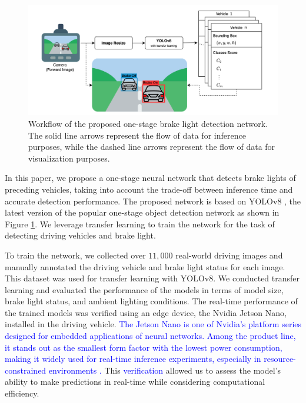 \begin{figure}[]
    \includegraphics[scale=0.5]{fig/workflow.png}
    \caption{Workflow of the proposed one-stage brake light detection network. The solid line arrows represent the flow of data for inference purposes, while the dashed line arrows represent the flow of data for visualization purposes.}
    \label{fig:workflow}
\end{figure}

In this paper, we propose a one-stage neural network that detects brake lights of preceding vehicles, taking into account the trade-off between inference time and accurate detection performance. 
The proposed network is based on YOLOv8 \cite{YOLOv8}, the latest version of the popular one-stage object detection network as shown in Figure \ref{fig:workflow}.
We leverage transfer learning to train the network for the task of detecting driving vehicles and brake light.

To train the network, we collected over $11,000$ real-world driving images and manually annotated the driving vehicle and brake light status for each image.
This dataset was used for transfer learning with YOLOv8. 
We conducted transfer learning and evaluated the performance of the models in terms of model size, brake light status, and ambient lighting conditions.
The real-time performance of the trained models was verified using an edge device, the Nvidia Jetson Nano, installed in the driving vehicle.
\textcolor{blue}{The Jetson Nano is one of Nvidia's platform series designed for embedded applications of neural networks.
Among the product line, it stands out as the smallest form factor with the lowest power consumption, making it widely used for real-time inference experiments, especially in resource-constrained environments \cite{assunccao2022real}.}
This \textcolor{blue}{verification} allowed us to assess the model's ability to make predictions in real-time while considering computational efficiency.

